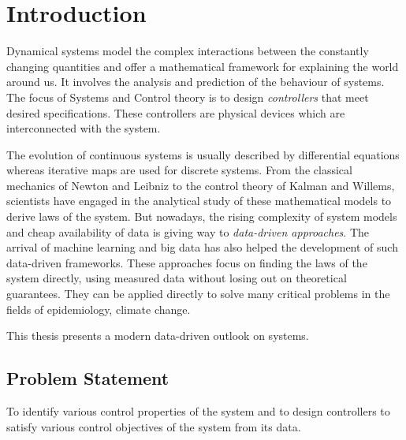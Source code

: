 
\chapter{Introduction}\doublespacing %

\label{chap:introduction} %


\thispagestyle{empty}  %
Dynamical systems model the complex interactions between the constantly changing quantities and offer a mathematical framework for explaining the world around us. It involves the analysis and prediction of the behaviour of systems. The focus of Systems and Control theory is to design \emph{controllers} that meet desired specifications. These controllers are physical devices which are interconnected with the system.

The evolution of continuous systems is usually described by differential equations whereas iterative maps are used for discrete systems. From the classical mechanics of Newton and Leibniz to the control theory of Kalman and Willems, scientists have engaged in the analytical study of these mathematical models to derive laws of the system. But nowadays, the rising complexity of system models and cheap availability of data is giving way to \emph{data-driven approaches}. The arrival of machine learning and big data has also helped the development of such data-driven frameworks. These approaches focus on finding the laws of the system directly, using measured data without losing out on theoretical guarantees. They can be applied directly to solve many critical problems in the fields of epidemiology, climate change.

This thesis presents a modern data-driven outlook on systems. 
\section{Problem Statement}
To identify various control properties of the system and to design controllers to satisfy various control objectives of the system from its data.
